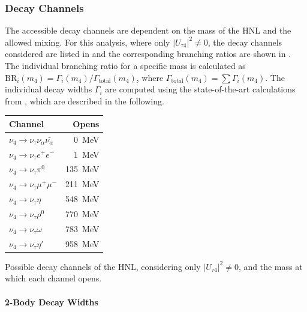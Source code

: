 \subsubsection{Decay Channels}

The accessible decay channels are dependent on the mass of the HNL and the allowed mixing. For this analysis, where only $|U_{\tau4}|^2 \neq 0$, the decay channels considered are listed in  and the corresponding branching ratios are shown in . The individual branching ratio for a specific mass is calculated as $\mathrm{BR}_i(m_4)=\Gamma_i(m_4)/\Gamma_\mathrm{total}(m_4)$, where $\Gamma_\mathrm{total}(m_4)=\sum\Gamma_i(m_4)$. The individual decay widths $\Gamma_i$ are computed using the state-of-the-art calculations from , which are described in the following.

\begin{margintable}
    \begin{tabular} { lr }
        \hline\hline 
        \textbf{Channel} & \textbf{Opens}  \\
        \hline\hline 
        $\nu_4 \rightarrow \nu_\tau \nu_\alpha \bar{\nu_\alpha}$ & \SI{0}{\MeV} \\
        $\nu_4 \rightarrow \nu_\tau e^+ e^-$ & \SI{1}{\MeV} \\
        $\nu_4 \rightarrow \nu_\tau \pi^0$ & \SI{135}{\MeV} \\
        $\nu_4 \rightarrow \nu_\tau \mu^+ \mu^-$ & \SI{211}{\MeV} \\
        $\nu_4 \rightarrow \nu_\tau \eta$ & \SI{548}{\MeV} \\
        $\nu_4 \rightarrow \nu_\tau \rho^0$ & \SI{770}{\MeV} \\
        $\nu_4 \rightarrow \nu_\tau \omega$ & \SI{783}{\MeV} \\
        $\nu_4 \rightarrow \nu_\tau \eta'$ & \SI{958}{\MeV} \\
        \hline
    \end{tabular}
    \caption[HNL mass dependent decay channels]{Possible decay channels of the HNL, considering only $|U_{\tau4}|^2 \neq 0$, and the mass at which each channel opens.}
\end{margintable}


\paragraph{2-Body Decay Widths}

